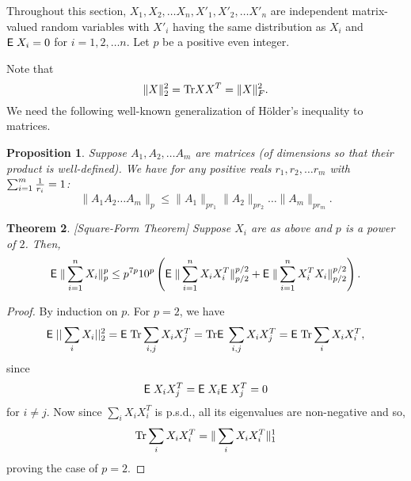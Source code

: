 \documentclass{book}
\newtheorem{theorem}{Theorem}[chapter]
\newtheorem{proposition}[theorem]{Proposition}
\numberwithin{exercise}{chapter}
\begin{document}
{Throughout this section, $X_1,X_2,\ldots X_n, X'_1,X'_2,\ldots X'_n$ are independent matrix-valued random variables with $X'_i$ having the same distribution as $X_i$ and $\hbox{{\sf E}\;} X_i =0$ for $i=1,2,
\ldots n$. Let $p$ be a positive even integer.

Note that
\[
\|X\|_2^2=\hbox{Tr} XX^T=\|X\|_F^2.
\]
We need the following well-known generalization of H\"older's inequality to
matrices.

\begin{proposition}\label{fact2}
Suppose $A_1,A_2,\ldots A_m$ are matrices (of dimensions so that their
product is well-defined). We have for any positive
reals $r_1,r_2,\ldots r_m$ with $\sum_{i=1}^m {1\over r_i}=1$:
$$\|A_1A_2\ldots A_m\|_p\leq \|A_1\|_{pr_1}\|A_2\|_{pr_2}\ldots \|A_m\|_{pr_m}.$$
\end{proposition}

\begin{theorem} \label{Xi}[Square-Form Theorem]
Suppose $X_i$ are as above and $p$ is a power of $2$. Then,
$$\hbox{{\sf E}\;}\|\sum_{i=1}^nX_i\|_p^p\leq p^{7p}10^p\left( \hbox{{\sf E}\;}\|\sum_{i=1}^nX_iX_i^T\|_{p/2}^{p/2}
+\hbox{{\sf E}\;}\|\sum_{i=1}^nX_i^TX_i\|_{p/2}^{p/2}\right).$$
\end{theorem}

\begin{proof} By induction on $p$. For $p=2$, we have
$$\hbox{{\sf E}\;}||\sum_iX_i||_2^2=\hbox{{\sf E}\;}\hbox{Tr} \sum_{i,j}X_iX_j^T=\hbox{Tr} \hbox{{\sf E}\;}\sum_{i,j}X_iX_j^T=\hbox{{\sf E}\;}\hbox{Tr} \sum_iX_iX_i^T,$$
since
\[
\hbox{{\sf E}\;} X_iX_j^T=\hbox{{\sf E}\;} X_i\hbox{{\sf E}\;} X_j^T=0
\]
for $i\not= j$. Now since $\sum_i
X_iX_i^T$ is p.s.d., all its eigenvalues are non-negative and so,
\[
\hbox{Tr} \sum_i X_iX_i^T=\|\sum_iX_iX_i^T\|_1^1
\]
proving the case of $p=2$.


\end{proof}}
\end{document}
